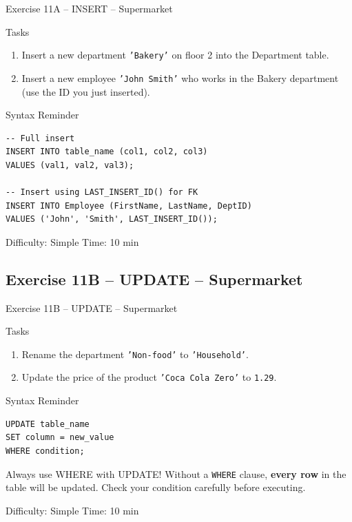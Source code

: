 \documentclass[10pt]{beamer}
\begin{document}
\begin{frame}[fragile]{Exercise 11A -- INSERT -- Supermarket}
  \begin{block}{Tasks}
    \begin{enumerate}
      \item Insert a new department \texttt{'Bakery'} on floor 2 into the Department table.
      \item Insert a new employee \texttt{'John Smith'} who works in the Bakery department (use the ID you just inserted).
    \end{enumerate}
  \end{block}

  \begin{block}{Syntax Reminder}
\begin{lstlisting}[style=sqlstyle]
-- Full insert
INSERT INTO table_name (col1, col2, col3)
VALUES (val1, val2, val3);

-- Insert using LAST_INSERT_ID() for FK
INSERT INTO Employee (FirstName, LastName, DeptID)
VALUES ('John', 'Smith', LAST_INSERT_ID());
\end{lstlisting}
  \end{block}

  \begin{alertblock}{Difficulty: Simple \quad Time: 10 min}
  \end{alertblock}
\end{frame}

\subsection{Exercise 11B -- UPDATE -- Supermarket}

\begin{frame}[fragile]{Exercise 11B -- UPDATE -- Supermarket}
  \begin{block}{Tasks}
    \begin{enumerate}
      \item Rename the department \texttt{'Non-food'} to \texttt{'Household'}.
      \item Update the price of the product \texttt{'Coca Cola Zero'} to \texttt{1.29}.
    \end{enumerate}
  \end{block}

  \begin{block}{Syntax Reminder}
\begin{lstlisting}[style=sqlstyle]
UPDATE table_name
SET column = new_value
WHERE condition;
\end{lstlisting}
  \end{block}

  \begin{alertblock}{Always use WHERE with UPDATE!}
    Without a \texttt{WHERE} clause, \textbf{every row} in the table will be updated.
    Check your condition carefully before executing.
  \end{alertblock}

  \begin{alertblock}{Difficulty: Simple \quad Time: 10 min}
  \end{alertblock}
\end{frame}
\end{document}
